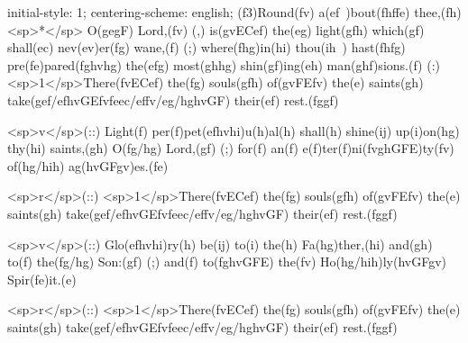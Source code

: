 initial-style: 1;
centering-scheme: english;
(f3)Round(fv) a(ef~)bout(fhffe) thee,(fh) <sp>*</sp> O(gegF) Lord,(fv) (,) is(gvECef) the(eg) light(gfh) which(gf) shall(ec) nev(ev)er(fg) wane,(f) (;) where(fhg)in(hi) thou(ih~) hast(fhfg) pre(fe)pared(fghvhg) the(efg) most(ghhg) shin(gf)ing(eh) man(ghf)sions.(f) (:) <sp>1</sp>There(fvECef) the(fg) souls(gfh) of(gvFEfv) the(e) saints(gh) take(gef/efhvGEfvfeec/effv/eg/hghvGF) their(ef) rest.(fggf)

<sp>v</sp>(::) Light(f) per(f)pet(efhvhi)u(h)al(h) shall(h) shine(ij) up(i)on(hg) thy(hi) saints,(gh) O(fg/hg) Lord,(gf) (;) for(f) an(f) e(f)ter(f)ni(fvghGFE)ty(fv) of(hg/hih) ag(hvGFgv)es.(fe)

<sp>r</sp>(::) <sp>1</sp>There(fvECef) the(fg) souls(gfh) of(gvFEfv) the(e) saints(gh) take(gef/efhvGEfvfeec/effv/eg/hghvGF) their(ef) rest.(fggf)

<sp>v</sp>(::) Glo(efhvhi)ry(h) be(ij) to(i) the(h) Fa(hg)ther,(hi) and(gh) to(f) the(fg/hg) Son:(gf) (;) and(f) to(fghvGFE) the(fv) Ho(hg/hih)ly(hvGFgv) Spir(fe)it.(e)

<sp>r</sp>(::) <sp>1</sp>There(fvECef) the(fg) souls(gfh) of(gvFEfv) the(e) saints(gh) take(gef/efhvGEfvfeec/effv/eg/hghvGF) their(ef) rest.(fggf)
